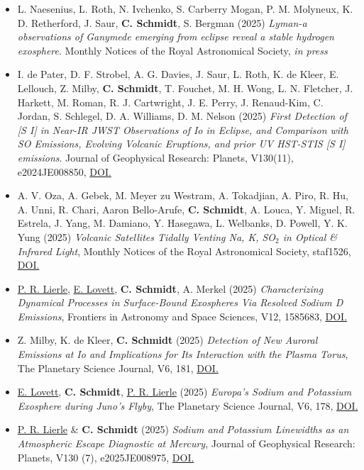 \documentclass[12pt]{report}
\begin{document}
\begin{itemize} \itemsep -2pt %
  \item L. Naesenius, L. Roth, N. Ivchenko, S. Carberry Mogan, P. M. Molyneux, K. D. Retherford, J. Saur, \textbf{C. Schmidt}, S. Bergman (2025) \textit{Lyman-a observations of Ganymede emerging from eclipse reveal a stable hydrogen exosphere}. Monthly Notices of the Royal Astronomical Society, \textit{in press} 
  \item I. de Pater, D. F. Strobel, A. G. Davies, J. Saur, L. Roth, K. de Kleer, E. Lellouch, Z. Milby, \textbf{C. Schmidt}, T. Fouchet, M. H. Wong, L. N. Fletcher, J. Harkett, M. Roman, R. J. Cartwright, J. E. Perry, J. Renaud-Kim, C. Jordan, S. Schlegel, D. A. Williams, D. M. Nelson (2025) \textit{First Detection of [S I] in Near-IR JWST Observations of Io in Eclipse, and Comparison with SO Emissions, Evolving Volcanic Eruptions, and prior UV HST-STIS [S I] emissions}. Journal of Geophysical Research: Planets, V130(11), e2024JE008850, \href{https://doi.org/10.1029/2024JE008850}{DOI.} 
  \item A. V. Oza, A. Gebek, M. Meyer zu Westram, A. Tokadjian, A. Piro, R. Hu, A. Unni, R. Chari, Aaron Bello-Arufe, \textbf{C. Schmidt}, A. Louca, Y. Miguel, R. Estrela, J. Yang, M. Damiano, Y. Hasegawa, L. Welbanks, D. Powell, Y. K. Yung (2025) \textit{Volcanic Satellites Tidally Venting Na, K, SO$_2$ in Optical \& Infrared Light}, Monthly Notices of the Royal Astronomical Society, staf1526, \href{https://doi.org/10.1093/mnras/staf1526}{DOI.} 
  \item \underline{P. R. Lierle}, \underline{E. Lovett}, \textbf{C. Schmidt}, A. Merkel (2025) \textit{Characterizing Dynamical Processes in Surface-Bound Exospheres Via Resolved Sodium D Emissions}, Frontiers in Astronomy and Space Sciences, V12, 1585683, \href{https://doi.org/10.3389/fspas.2025.1585683}{DOI.} 
  \item Z. Milby, K. de Kleer, \textbf{C. Schmidt} (2025) \textit{Detection of New Auroral Emissions at Io and Implications for Its Interaction with the Plasma Torus}, The Planetary Science Journal, V6, 181, \href{https://doi.org/10.3847/PSJ/ade0b1}{DOI.} 
  \item \underline{E. Lovett}, \textbf{C. Schmidt}, \underline{P. R. Lierle} (2025) \textit{Europa’s Sodium and Potassium Exosphere during Juno’s Flyby}, The Planetary Science Journal, V6, 178, \href{https://doi.org/10.3847/PSJ/adeb52}{DOI.} 
  \item \underline{P. R. Lierle} \& \textbf{C. Schmidt} (2025) \textit{Sodium and Potassium Linewidths as an Atmospheric Escape Diagnostic at Mercury}, Journal of Geophysical Research: Planets, V130 (7), e2025JE008975, \href{https://doi.org/10.1029/2025JE008975}{DOI.}

\end{itemize}
\end{document}
